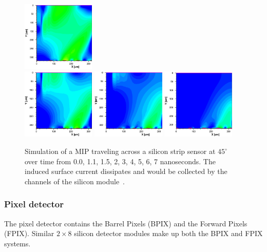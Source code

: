 \begin{figure}[ht!b]
  \includegraphics[width=0.31\textwidth]{figures/silicon/silicon_t4.0.png}\\
  \includegraphics[width=0.31\textwidth]{figures/silicon/silicon_t5.0.png}
  \includegraphics[width=0.31\textwidth]{figures/silicon/silicon_t6.0.png}
  \includegraphics[width=0.31\textwidth]{figures/silicon/silicon_t7.0.png}\\
    \caption{Simulation of a MIP traveling across a silicon strip sensor at $45^\circ$ over time from 0.0, 1.1, 1.5, 2, 3, 4, 5, 6, 7 nanoseconds. The induced surface current dissipates and would be collected by the channels of the silicon module~\cite{Eichhorn:2112017}.}
\end{figure}





\subsubsection{Pixel detector}
\label{sec:pixeldet}
The pixel detector contains the Barrel Pixels (BPIX) and the Forward Pixels (FPIX).  
Similar $2\times8$ silicon detector modules make up both the BPIX and FPIX systems.

